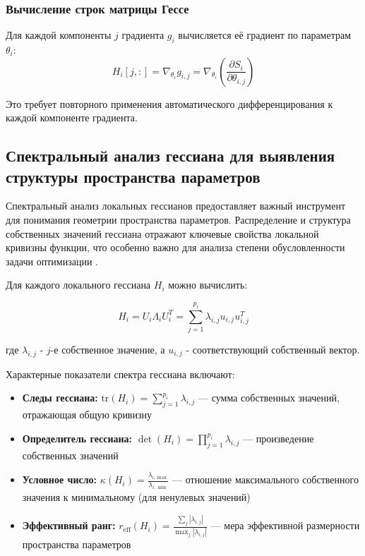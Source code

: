 \documentclass[a4paper,12pt]{article}
\begin{document}
\subsubsection{Вычисление строк матрицы Гессе}
Для каждой компоненты $j$ градиента $g_i$ вычисляется её градиент по параметрам $\theta_i$:
\begin{equation}
  H_i[j,:] = \nabla_{\theta_i} g_{i,j} = \nabla_{\theta_i} \left( \frac{\partial S_i}{\partial \theta_{i,j}} \right)
\end{equation}

Это требует повторного применения автоматического дифференцирования к каждой компоненте градиента.

\subsection{Спектральный анализ гессиана для выявления структуры пространства параметров}

Спектральный анализ локальных гессианов предоставляет важный инструмент для понимания геометрии пространства
параметров. Распределение и структура собственных значений гессиана отражают ключевые свойства локальной
кривизны функции, что особенно важно для анализа степени обусловленности задачи оптимизации \cite{sagun2016,
liaomahoney2021}.

Для каждого локального гессиана $H_i$ можно вычислить:

\begin{equation}
  H_i = U_i\Lambda_i U_i^T = \sum_{j=1}^{p_i} \lambda_{i,j} u_{i,j} u_{i,j}^T
\end{equation}

где $\lambda_{i,j}$ - $j$-е собственное значение, а $u_{i,j}$ - соответствующий собственный вектор.

Характерные показатели спектра гессиана включают:

\begin{itemize}
  \item \textbf{Следы гессиана:} $\text{tr}(H_i) = \sum_{j=1}^{p_i} \lambda_{i,j}$ — сумма собственных
    значений, отражающая общую кривизну
  \item \textbf{Определитель гессиана:} $\det(H_i) = \prod_{j=1}^{p_i} \lambda_{i,j}$ — произведение
    собственных значений
  \item \textbf{Условное число:} $\kappa(H_i) = \frac{\lambda_{i,\max}}{\lambda_{i,\min}}$ — отношение
    максимального собственного значения к минимальному (для ненулевых значений)
  \item \textbf{Эффективный ранг:} $r_{\text{eff}}(H_i) = \frac{\sum_{j} |\lambda_{i,j}|}{\max_j
    |\lambda_{i,j}|}$ — мера эффективной размерности пространства параметров
\end{itemize}
\end{document}
